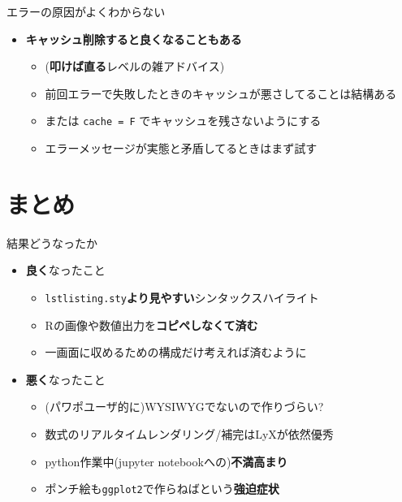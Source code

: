 \documentclass[
  12pt,
  ignorenonframetext,
]{beamer}
\providecommand{\tightlist}{%
  \setlength{\itemsep}{0pt}\setlength{\parskip}{0pt}}
\begin{document}
\begin{frame}[fragile]{エラーの原因がよくわからない}
\protect\hypertarget{ux30a8ux30e9ux30fcux306eux539fux56e0ux304cux3088ux304fux308fux304bux3089ux306aux3044}{}

\begin{itemize}
\tightlist
\item
  \textbf{キャッシュ削除すると良くなることもある}

  \begin{itemize}
  \tightlist
  \item
    (\textbf{叩けば直る}レベルの雑アドバイス)
  \item
    前回エラーで失敗したときのキャッシュが悪さしてることは結構ある
  \item
    または \texttt{cache\ =\ F} でキャッシュを残さないようにする
  \item
    エラーメッセージが実態と矛盾してるときはまず試す
  \end{itemize}
\end{itemize}

\end{frame}

\hypertarget{ux307eux3068ux3081}{%
\section{まとめ}\label{ux307eux3068ux3081}}

\begin{frame}[fragile]{結果どうなったか}
\protect\hypertarget{ux7d50ux679cux3069ux3046ux306aux3063ux305fux304b}{}

\begin{itemize}
\tightlist
\item
  \textbf{良く}なったこと

  \begin{itemize}
  \tightlist
  \item
    \texttt{lstlisting.sty}\textbf{より見やすい}シンタックスハイライト
  \item
    Rの画像や数値出力を\textbf{コピペしなくて済む}
  \item
    一画面に収めるための構成だけ考えれば済むように
  \end{itemize}
\item
  \textbf{悪く}なったこと

  \begin{itemize}
  \tightlist
  \item
    (パワポユーザ的に)WYSIWYGでないので作りづらい?
  \item
    数式のリアルタイムレンダリング/補完はLyXが依然優秀
  \item
    python作業中(jupyter notebookへの)\textbf{不満高まり}
  \item
    ポンチ絵も\texttt{ggplot2}で作らねばという\textbf{強迫症状}
  \end{itemize}
\end{itemize}

\end{frame}
\end{document}
